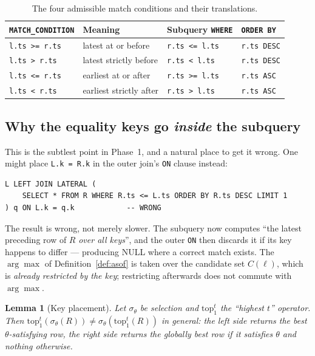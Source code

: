 \documentclass[11pt,a4paper]{report}
\theoremstyle{definition}
\theoremstyle{plain}
\newtheorem{lemma}[definition]{Lemma}
\newcommand{\code}[1]{\texttt{\small #1}}
\begin{document}
\begin{table}[h]
\centering
\footnotesize
\renewcommand{\arraystretch}{1.25}
\begin{tabular}{@{}llll@{}}
\toprule
\textbf{\code{MATCH\_CONDITION}} & \textbf{Meaning} & \textbf{Subquery \code{WHERE}} & \textbf{\code{ORDER BY}}\\
\midrule
\code{l.ts >= r.ts} & latest at or before & \code{r.ts <= l.ts} & \code{r.ts DESC}\\
\code{l.ts > r.ts}  & latest strictly before & \code{r.ts < l.ts} & \code{r.ts DESC}\\
\code{l.ts <= r.ts} & earliest at or after & \code{r.ts >= l.ts} & \code{r.ts ASC}\\
\code{l.ts < r.ts}  & earliest strictly after & \code{r.ts > l.ts} & \code{r.ts ASC}\\
\bottomrule
\end{tabular}
\caption{The four admissible match conditions and their translations.}
\label{tab:directions}
\end{table}

\subsection{Why the equality keys go \emph{inside} the subquery}

This is the subtlest point in Phase~1, and a natural place to get it wrong. One might
place \code{L.k = R.k} in the outer join's \code{ON} clause instead:

\begin{lstlisting}
L LEFT JOIN LATERAL (
    SELECT * FROM R WHERE R.ts <= L.ts ORDER BY R.ts DESC LIMIT 1
) q ON L.k = q.k            -- WRONG
\end{lstlisting}

The result is wrong, not merely slower. The subquery now computes ``the latest preceding
row of $R$ \emph{over all keys}'', and the outer \code{ON} then discards it if its key
happens to differ --- producing NULL where a correct match exists. The $\arg\max$ of
Definition~\ref{def:asof} is taken over the candidate set $C(\ell)$, which is
\emph{already restricted by the key}; restricting afterwards does not commute with
$\arg\max$.

\begin{lemma}[Key placement]
Let $\sigma_\theta$ be selection and $\mathrm{top}_1^{t}$ the ``highest $t$'' operator.
Then $\mathrm{top}_1^{t}(\sigma_\theta(R)) \neq \sigma_\theta(\mathrm{top}_1^{t}(R))$ in
general: the left side returns the best $\theta$-satisfying row, the right side returns the
globally best row if it satisfies $\theta$ and nothing otherwise.
\end{lemma}
\end{document}
